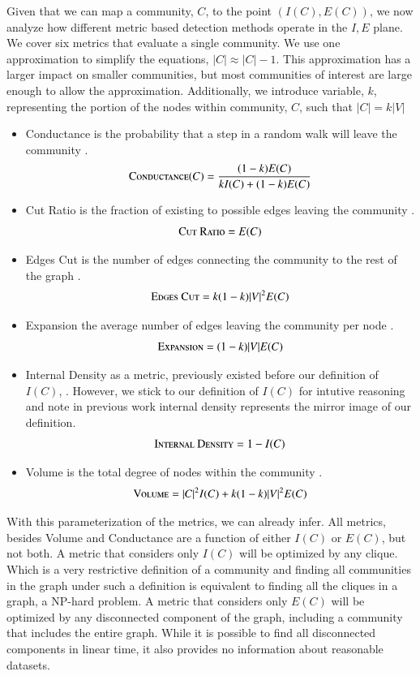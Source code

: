 \documentclass[phd,tocprelim]{cornell}
\begin{document}
Given that we can map a community, $C$, to the point $(I(C), E(C))$, we now analyze how different metric based detection methods operate in the $I,E$ plane.  We cover six metrics that evaluate a single community.  We use one approximation to simplify the equations, $|C| \approx |C| - 1$.  This approximation has a larger impact on smaller communities, but most communities of interest are large enough to allow the approximation.  Additionally, we introduce variable, $k$, representing the portion of the nodes within community, $C$, such that $|C| = k |V|$
\begin{itemize}
\item {\sc Conductance} is the probability that a step in a random walk will leave the community \cite{JTODO}.
\begin{equation}
\mbox{\sc Conductance}(C) = \frac{(1 - k)E(C)}{kI(C) + (1 - k)E(C)}
\end{equation}
\item {\sc Cut Ratio} is the fraction of existing to possible edges leaving the community \cite{JTODO}.
\begin{equation}
\mbox{\sc Cut Ratio} = E(C)
\end{equation}
\item {\sc Edges Cut} is the number of edges connecting the community to the rest of the graph \cite{JTODO}.\begin{equation}
\mbox{\sc Edges Cut} = k (1-k) |V|^2 E(C)
\end{equation}
\item {\sc Expansion} the average number of edges leaving the community per node \cite{JTODO}.
\begin{equation}
\mbox{\sc Expansion} = (1 - k)|V |E(C)
\end{equation}
\item {\sc Internal Density} as a metric, previously existed before our definition of $I(C)$, \cite{JTODO}.  However, we stick to our definition of $I(C)$ for intutive reasoning and note in previous work internal density represents the mirror image of our definition.
\begin{equation}
\mbox{\sc Internal Density} = 1 - I(C)
\end{equation}
\item {\sc Volume} is the total degree of nodes within the community \cite{JTODO}.
\begin{equation}
\mbox{\sc Volume} = |C|^2 I(C) + k(1-k)|V|^2E(C)
\end{equation}
\end{itemize}
 With this parameterization of the metrics, we can already infer.  All metrics, besides {\sc Volume} and {\sc Conductance} are a function of either $I(C)$ or $E(C)$, but not both.  A metric that considers only $I(C)$ will be optimized by any clique.  Which is a very restrictive definition of a community and finding all communities in the graph under such a definition is equivalent to finding all the cliques in a graph, a NP-hard problem.  A metric that considers only $E(C)$ will be optimized by any disconnected component of the graph, including a community that includes the entire graph.  While it is possible to find all disconnected components in linear time, it also provides no information about reasonable datasets.
\end{document}
